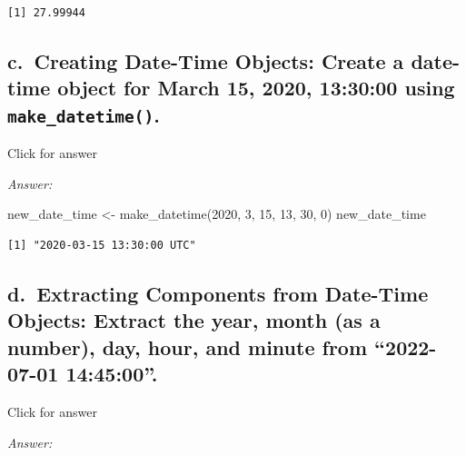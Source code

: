 \documentclass[
]{book}
\newenvironment{Shaded}{\begin{snugshade}}{\end{snugshade}}
\newcommand{\DecValTok}[1]{\textcolor[rgb]{0.00,0.00,0.81}{#1}}
\newcommand{\FunctionTok}[1]{\textcolor[rgb]{0.00,0.00,0.00}{#1}}
\newcommand{\NormalTok}[1]{#1}
\newcommand{\OtherTok}[1]{\textcolor[rgb]{0.56,0.35,0.01}{#1}}
\begin{document}
\begin{verbatim}
[1] 27.99944
\end{verbatim}

\hypertarget{c.-creating-date-time-objects-create-a-date-time-object-for-march-15-2020-133000-using-make_datetime.}{%
\subsection{\texorpdfstring{c.~Creating Date-Time Objects: Create a date-time object for March 15, 2020, 13:30:00 using \texttt{make\_datetime()}.}{c.~Creating Date-Time Objects: Create a date-time object for March 15, 2020, 13:30:00 using make\_datetime().}}\label{c.-creating-date-time-objects-create-a-date-time-object-for-march-15-2020-133000-using-make_datetime.}}

Click for answer

\emph{Answer:}

\begin{Shaded}
\begin{Highlighting}[]
\NormalTok{new\_date\_time }\OtherTok{\textless{}{-}} \FunctionTok{make\_datetime}\NormalTok{(}\DecValTok{2020}\NormalTok{, }\DecValTok{3}\NormalTok{, }\DecValTok{15}\NormalTok{, }\DecValTok{13}\NormalTok{, }\DecValTok{30}\NormalTok{, }\DecValTok{0}\NormalTok{)}
\NormalTok{new\_date\_time}
\end{Highlighting}
\end{Shaded}

\begin{verbatim}
[1] "2020-03-15 13:30:00 UTC"
\end{verbatim}

\hypertarget{d.-extracting-components-from-date-time-objects-extract-the-year-month-as-a-number-day-hour-and-minute-from-2022-07-01-144500.}{%
\subsection{d.~Extracting Components from Date-Time Objects: Extract the year, month (as a number), day, hour, and minute from ``2022-07-01 14:45:00''.}\label{d.-extracting-components-from-date-time-objects-extract-the-year-month-as-a-number-day-hour-and-minute-from-2022-07-01-144500.}}

Click for answer

\emph{Answer:}
\end{document}

